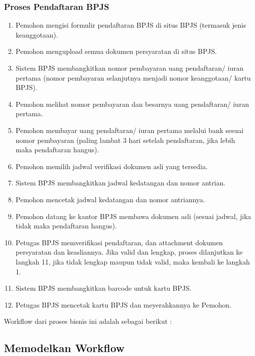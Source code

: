 \subsubsection{Proses Pendaftaran BPJS}
\begin{enumerate}
	\item Pemohon mengisi formulir pendaftaran BPJS di situs BPJS (termasuk jenis keanggotaan).
	\item Pemohon mengupload semua dokumen persyaratan di situs BPJS.
	\item Sistem BPJS membangkitkan nomor pembayaran uang pendaftaran/ iuran pertama (nomor pembayaran selanjutnya menjadi nomor keanggotaan/ kartu BPJS).
  \item Pemohon melihat nomor pembayaran dan besarnya uang pendaftaran/ iuran pertama.
  \item Pemohon membayar uang pendaftaran/ iuran pertama melalui bank sesuai nomor pembayaran (paling lambat 3 hari setelah pendaftaran, jika lebih maka pendaftaran hangus).
  \item Pemohon memilih jadwal verifikasi dokumen asli yang tersedia.
  \item Sistem BPJS membangkitkan jadwal kedatangan dan nomor antrian.
  \item Pemohon mencetak jadwal kedatangan dan nomor antriannya.
  \item Pemohon datang ke kantor BPJS membawa dokumen asli (sesuai jadwal, jika tidak maka pendaftaran hangus). 
  \item Petugas BPJS memverifikasi pendaftaran, dan attachment dokumen persyaratan dan keasliannya. Jika valid dan lengkap, proses dilanjutkan ke langkah 11, jika tidak lengkap maupun tidak valid, maka kembali ke langkah 1.
	\item Sistem BPJS membangkitkan barcode untuk kartu BPJS.
  \item Petugas BPJS mencetak kartu BPJS dan meyerahkannya ke Pemohon.
\end{enumerate}
Workflow dari proses bisnis ini adalah sebagai berikut :
		
		


\subsection{Memodelkan Workflow}

